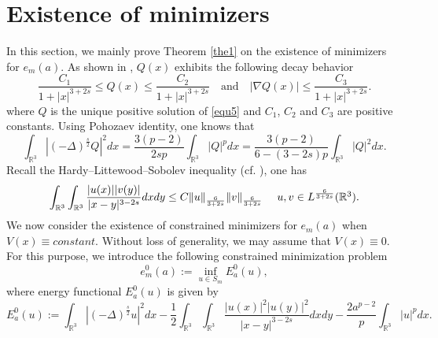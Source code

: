 \documentclass[reqno, 11pt]{amsart} %
\numberwithin{equation}{section}
\begin{document}
	\section{Existence of minimizers}\label{sec 2}
	In this section, we mainly prove Theorem \ref{the1} on the existence of minimizers for $e_{m}(a)$. As shown in \cite[Theorem 1.1]{D}, $Q(x)$ exhibits the following decay behavior
	\begin{equation}\label{equ6}
		\frac{C_{1}}{1+|x|^{3+2s}}\leq Q(x)\leq\frac{C_{2}}{1+|x|^{3+2s}}\quad \mathrm {and} \quad	|\nabla Q(x)|\leq\frac{C_{3}}{1+|x|^{3+2s}}.
	\end{equation}
	where $Q$ is the unique positive solution of \eqref{equ5} and $C_{1}$, $C_{2}$ and $C_{3}$ are positive constants. Using  Pohozaev identity, one knows that
	\begin{equation}\label{equ7}
		\int_{\mathbb{R}^{3}}|(-\Delta)^{\frac{s}{2}}Q|^{2}dx=\frac{3(p-2)}{2sp}\int_{\mathbb{R}^{3}}|Q|^{p}dx=\frac{3(p-2)}{6-(3-2s)p}\int_{\mathbb{R}^{3}}|Q|^{2}dx.
	\end{equation}
	Recall the Hardy–Littewood–Sobolev inequality (cf. \cite[Theorem 4.3]{L}), one has
	\begin{equation}\label{equ8}
		\int_{\mathbb{R}^{3}}\int_{\mathbb{R}^{3}}\frac{|u(x)||v(y)|}{|x-y|^{3-2s}}dxdy\leq C\|u\|_{\frac{6}{3+2s}}\|v\|_{\frac{6}{3+2s}}\quad \hbox{ $u, v\in L^{\frac{6}{3+2s}}(\mathbb{R}^{3})$}.
	\end{equation}
We now consider the existence of constrained minimizers for $e_{m}(a)$ when $V(x)\equiv constant$. Without loss of generality, we may assume that $V(x)\equiv0$. For this purpose, we introduce the following constrained minimization problem
	\begin{equation*}
		e^{0}_{m}(a):=\inf_{u\in S_{m}}E^{0}_{a}(u),
	\end{equation*}
	where energy functional $E^{0}_{a}(u)$ is given by
	\begin{equation*}
		E^{0}_{a}(u):=\int_{\mathbb{R}^{3}}|(-\Delta)^{\frac{s}{2}} u|^{2}dx-\frac{1}{2}\int_{\mathbb{R}^{3}}\int_{\mathbb{R}^{3}}\frac{|u(x)|^{2}|u(y)|^{2}}{|x-y|^{3-2s}}dxdy-\frac{2a^{p-2}}{p}\int_{\mathbb{R}^{3}}|u|^{p}dx.
	\end{equation*}	
	
\end{document}
